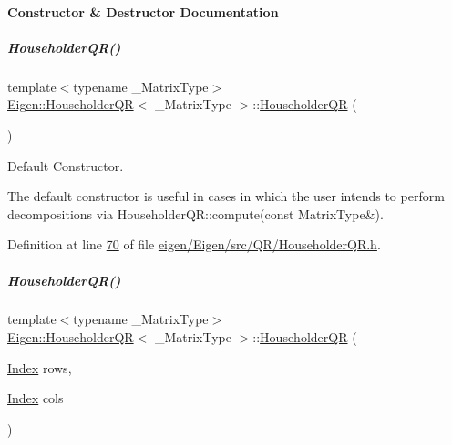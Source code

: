 \paragraph{Constructor \& Destructor Documentation}
\mbox{\label{group___q_r___module_a974adb10a0e066057aeb3b360df68380}} 
\subparagraph{\texorpdfstring{Householder\+Q\+R()}{HouseholderQR()}\hspace{0.1cm}{\footnotesize\ttfamily [1/8]}}
{\footnotesize\ttfamily template$<$typename \+\_\+\+Matrix\+Type$>$ \\
\hyperlink{group___q_r___module_class_eigen_1_1_householder_q_r}{Eigen\+::\+Householder\+QR}$<$ \+\_\+\+Matrix\+Type $>$\+::\hyperlink{group___q_r___module_class_eigen_1_1_householder_q_r}{Householder\+QR} (\begin{DoxyParamCaption}{ }\end{DoxyParamCaption})\hspace{0.3cm}{\ttfamily [inline]}}



Default Constructor. 

The default constructor is useful in cases in which the user intends to perform decompositions via Householder\+Q\+R\+::compute(const Matrix\+Type\&). 

Definition at line \hyperlink{eigen_2_eigen_2src_2_q_r_2_householder_q_r_8h_source_l00070}{70} of file \hyperlink{eigen_2_eigen_2src_2_q_r_2_householder_q_r_8h_source}{eigen/\+Eigen/src/\+Q\+R/\+Householder\+Q\+R.\+h}.

\mbox{\label{group___q_r___module_a1087457610c53e1574de521a51de0cd3}} 
\subparagraph{\texorpdfstring{Householder\+Q\+R()}{HouseholderQR()}\hspace{0.1cm}{\footnotesize\ttfamily [2/8]}}
{\footnotesize\ttfamily template$<$typename \+\_\+\+Matrix\+Type$>$ \\
\hyperlink{group___q_r___module_class_eigen_1_1_householder_q_r}{Eigen\+::\+Householder\+QR}$<$ \+\_\+\+Matrix\+Type $>$\+::\hyperlink{group___q_r___module_class_eigen_1_1_householder_q_r}{Householder\+QR} (\begin{DoxyParamCaption}\item[{\hyperlink{namespace_eigen_a62e77e0933482dafde8fe197d9a2cfde}{Index}}]{rows,  }\item[{\hyperlink{namespace_eigen_a62e77e0933482dafde8fe197d9a2cfde}{Index}}]{cols }\end{DoxyParamCaption})\hspace{0.3cm}{\ttfamily [inline]}}



